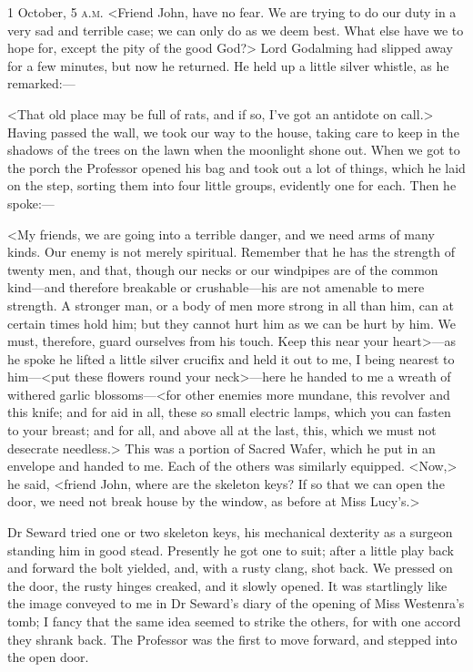 \begin{diary}{1 October, 5 \textsc{a.m.}}
<Friend John, have no fear. We are trying to do our duty in a very sad and terrible case; we can only do as we deem best. What else have we to hope for, except the pity of the good God?> Lord Godalming had slipped away for a few minutes, but now he returned. He held up a little silver whistle, as he remarked:—

<That old place may be full of rats, and if so, I've got an antidote on call.> Having passed the wall, we took our way to the house, taking care to keep in the shadows of the trees on the lawn when the moonlight shone out. When we got to the porch the Professor opened his bag and took out a lot of things, which he laid on the step, sorting them into four little groups, evidently one for each. Then he spoke:—

<My friends, we are going into a terrible danger, and we need arms of many kinds. Our enemy is not merely spiritual. Remember that he has the strength of twenty men, and that, though our necks or our windpipes are of the common kind—and therefore breakable or crushable—his are not amenable to mere strength. A stronger man, or a body of men more strong in all than him, can at certain times hold him; but they cannot hurt him as we can be hurt by him. We must, therefore, guard ourselves from his touch. Keep this near your heart>—as he spoke he lifted a little silver crucifix and held it out to me, I being nearest to him—<put these flowers round your neck>—here he handed to me a wreath of withered garlic blossoms—<for other enemies more mundane, this revolver and this knife; and for aid in all, these so small electric lamps, which you can fasten to your breast; and for all, and above all at the last, this, which we must not desecrate needless.> This was a portion of Sacred Wafer, which he put in an envelope and handed to me. Each of the others was similarly equipped. <Now,> he said, <friend John, where are the skeleton keys? If so that we can open the door, we need not break house by the window, as before at Miss Lucy's.>

Dr Seward tried one or two skeleton keys, his mechanical dexterity as a surgeon standing him in good stead. Presently he got one to suit; after a little play back and forward the bolt yielded, and, with a rusty clang, shot back. We pressed on the door, the rusty hinges creaked, and it slowly opened. It was startlingly like the image conveyed to me in Dr Seward's diary of the opening of Miss Westenra's tomb; I fancy that the same idea seemed to strike the others, for with one accord they shrank back. The Professor was the first to move forward, and stepped into the open door.


\end{diary}

